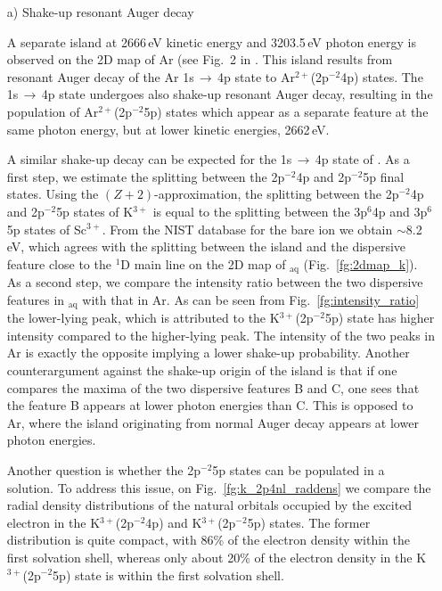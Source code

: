 \begin{enumerate}

\item[a)] Shake-up resonant Auger decay

A separate island at 2666\,eV kinetic energy and 3203.5\,eV photon energy is observed on the 2D map of Ar (see Fig.\ 2 in \citep{ceolin15:022502}. This island results from resonant Auger decay of the Ar 1s$\,\rightarrow\,$4p state to Ar$^{2+}$(2p$^{-2}$4p) states. The 1s$\,\rightarrow\,$4p state undergoes also shake-up resonant Auger decay, resulting in the population of Ar$^{2+}$(2p$^{-2}$5p) states which appear as a separate feature at the same photon energy, but at lower kinetic energies, 2662\,eV.


A similar shake-up decay can be expected for the 1s$\,\rightarrow\,$4p state of \ki. As a first step, we estimate the splitting between the 2p$^{-2}$4p and 2p$^{-2}$5p final states. Using the $(Z+2)$-approximation, the splitting between the 2p$^{-2}$4p and 2p$^{-2}$5p states of K$^{3+}$ is equal to the splitting between the 3p$^6$4p and 3p$^6$5p states of Sc$^{3+}$. From the NIST database \citep{NIST_ASD} for the bare ion we obtain $\sim$8.2\,eV, which agrees with the splitting between the island and the dispersive feature close to the $^1$D main line on the 2D map of \ki$_\text{aq}$ (Fig.\ \ref{fg:2dmap_k}). As a second step, we compare the intensity ratio between the two dispersive features in \ki$_{\text{aq}}$ with that in Ar. As can be seen from Fig.\ \ref{fg:intensity_ratio} the lower-lying peak, which is attributed to the K$^{3+}$(2p$^{-2}$5p) state has higher intensity compared to the higher-lying peak. The intensity of the two peaks in Ar is exactly the opposite implying a lower shake-up probability. Another counterargument against the shake-up origin of the island is that if one compares the maxima of the two dispersive features B and C, one sees that the feature B appears at lower photon energies than C. This is opposed to Ar, where the island originating from normal Auger decay appears at lower photon energies.

Another question is whether the 2p$^{-2}$5p states can be populated in a solution. To address this issue, on Fig.\ \ref{fg:k_2p4nl_raddens} we compare the radial density distributions of the natural orbitals occupied by the excited electron in the K$^{3+}$(2p$^{-2}$4p) and K$^{3+}$(2p$^{-2}$5p) states. The former distribution is quite compact, with 86\% of the electron density within the first solvation shell, whereas only about 20\% of the electron density in the  K$^{3+}$(2p$^{-2}$5p) state is within the first solvation shell.



\end{enumerate}
